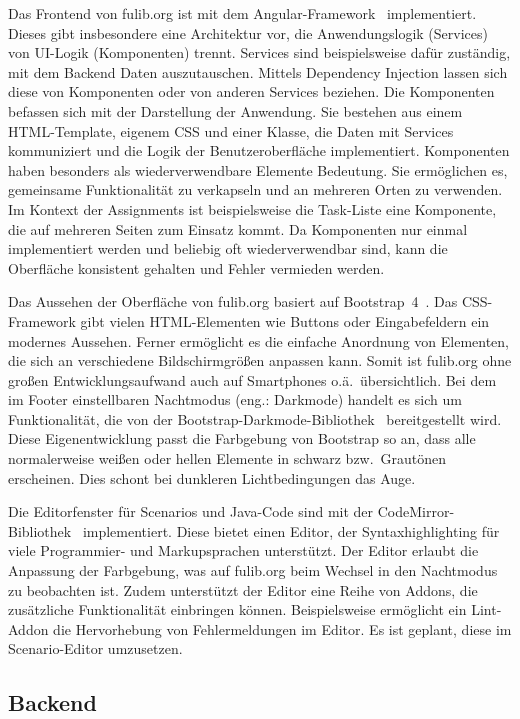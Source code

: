 Das Frontend von fulib.org ist mit dem Angular-Framework~\cite{angular} implementiert.
Dieses gibt insbesondere eine Architektur vor, die Anwendungslogik (Services) von UI-Logik (Komponenten) trennt.
Services sind beispielsweise dafür zuständig, mit dem Backend Daten auszutauschen.
Mittels Dependency Injection lassen sich diese von Komponenten oder von anderen Services beziehen.
Die Komponenten befassen sich mit der Darstellung der Anwendung.
Sie bestehen aus einem HTML-Template, eigenem CSS und einer Klasse,
die Daten mit Services kommuniziert und die Logik der Benutzeroberfläche implementiert.
Komponenten haben besonders als wiederverwendbare Elemente Bedeutung.
Sie ermöglichen es, gemeinsame Funktionalität zu verkapseln und an mehreren Orten zu verwenden.
Im Kontext der Assignments ist beispielsweise die Task-Liste eine Komponente, die auf mehreren Seiten zum Einsatz kommt.
Da Komponenten nur einmal implementiert werden und beliebig oft wiederverwendbar sind, kann die Oberfläche konsistent gehalten und Fehler vermieden werden.

Das Aussehen der Oberfläche von fulib.org basiert auf Bootstrap~4~\cite{bootstrap}.
Das CSS-Framework gibt vielen HTML-Elementen wie Buttons oder Eingabefeldern ein modernes Aussehen.
Ferner ermöglicht es die einfache Anordnung von Elementen, die sich an verschiedene Bildschirmgrößen anpassen kann.
Somit ist fulib.org ohne großen Entwicklungsaufwand auch auf Smartphones o.ä.\ übersichtlich.
Bei dem im Footer einstellbaren Nachtmodus (eng.: Darkmode) handelt es sich um Funktionalität,
die von der Bootstrap-Darkmode-Bibliothek~\cite{bootstrap-darkmode} bereitgestellt wird.
Diese Eigenentwicklung passt die Farbgebung von Bootstrap so an, dass alle normalerweise weißen oder hellen Elemente in schwarz bzw.\ Grautönen erscheinen.
Dies schont bei dunkleren Lichtbedingungen das Auge.

Die Editorfenster für Scenarios und Java-Code sind mit der CodeMirror-Bibliothek~\cite{codemirror} implementiert.
Diese bietet einen Editor, der Syntaxhighlighting für viele Programmier- und Markupsprachen unterstützt.
Der Editor erlaubt die Anpassung der Farbgebung, was auf fulib.org beim Wechsel in den Nachtmodus zu beobachten ist.
Zudem unterstützt der Editor eine Reihe von Addons, die zusätzliche Funktionalität einbringen können.
Beispielsweise ermöglicht ein Lint-Addon die Hervorhebung von Fehlermeldungen im Editor.
Es ist geplant, diese im Scenario-Editor umzusetzen.

\subsection{Backend}\label{subsec:backend}

